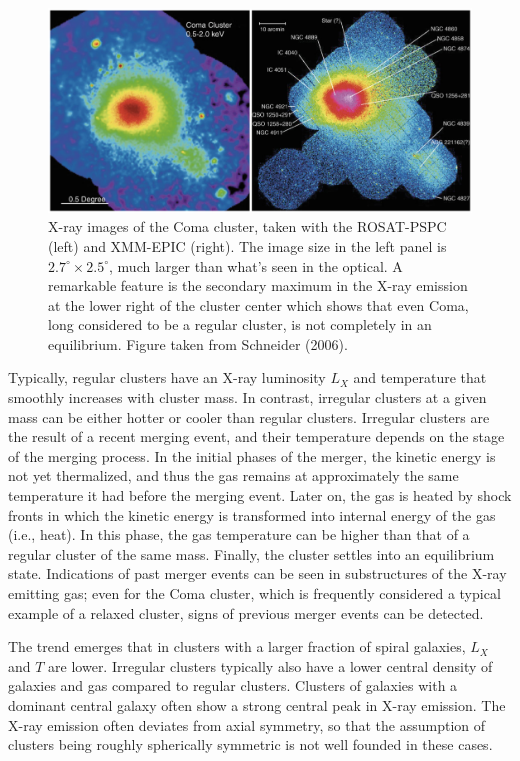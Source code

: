 \documentclass[a4paper,10pt]{article}
\begin{document}
\begin{figure}[t]
    \centering
    \includegraphics[width=14cm]{figures/ComaXray.png}
    \caption{\footnotesize{X-ray images of the Coma cluster, taken with the ROSAT-PSPC (left) and XMM-EPIC (right). The image size in the left panel is $2.7^\circ\times2.5^\circ$, much larger than what's seen in the optical. A remarkable feature is the secondary maximum in the X-ray emission at the lower right of the cluster center which shows that even Coma, long considered to be a regular cluster, is not completely in an equilibrium. Figure taken from Schneider (2006).}}
    \label{fig:comaxray}
\end{figure}

{\noindent}Typically, regular clusters have an X-ray luminosity $L_X$ and temperature that smoothly increases with cluster mass. In contrast, irregular clusters at a given mass can be either hotter or cooler than regular clusters. Irregular clusters are the result of a recent merging event, and their temperature depends on the stage of the merging process. In the initial phases of the merger, the kinetic energy is not yet thermalized, and thus the gas remains at approximately the same temperature it had before the merging event. Later on, the gas is heated by shock fronts in which the kinetic energy is transformed into internal energy of the gas (i.e., heat). In this phase, the gas temperature can be higher than that of a regular cluster of the same mass. Finally, the cluster settles into an equilibrium state. Indications of past merger events can be seen in substructures of the X-ray emitting gas; even for the Coma cluster, which is frequently considered a typical example of a relaxed cluster, signs of previous merger events can be detected.

{\noindent}The trend emerges that in clusters with a larger fraction of spiral galaxies, $L_X$ and $T$ are lower. Irregular clusters typically also have a lower central density of galaxies and gas compared to regular clusters. Clusters of galaxies with a dominant central galaxy often show a strong central peak in X-ray emission. The X-ray emission often deviates from axial symmetry, so that the assumption of clusters being roughly spherically symmetric is not well founded in these cases.
\end{document}
